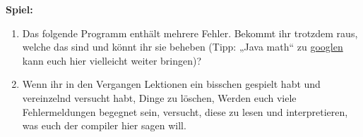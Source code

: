 \textbf{Spiel:}
\begin{enumerate}
\item Das folgende Programm enthält mehrere Fehler. Bekommt ihr trotzdem raus,
  welche das sind und könnt ihr sie beheben (Tipp: „Java math“ zu
  \href{http://lmgtfy.com/?q=java+math}{googlen} kann euch hier vielleicht
  weiter bringen)?

\item Wenn ihr in den Vergangen Lektionen ein bisschen gespielt habt und
  vereinzelnd versucht habt, Dinge zu löschen, Werden euch viele Fehlermeldungen
  begegnet sein, versucht, diese zu lesen und interpretieren, was euch der
  compiler hier sagen will.
\end{enumerate}
